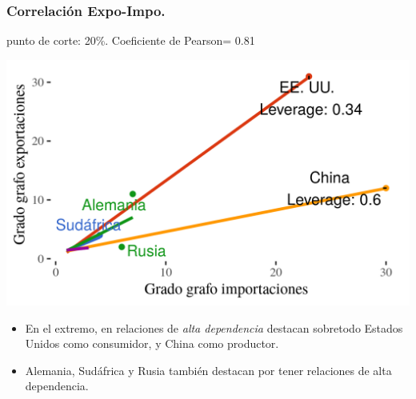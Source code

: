 \documentclass[compress]{beamer}
\begin{document}
\begin{frame}
\frametitle{Correlación Expo-Impo.}

punto de corte: 20\%.
Coeficiente de Pearson= 0.81

\includegraphics[width=\linewidth]{Graficos/corr_grados_2016_20_pcnt}

\end{frame}

\begin{frame}

\begin{itemize}
	\item[\faRebel] En el extremo, en relaciones de \textit{alta dependencia} destacan sobretodo Estados Unidos como consumidor, y China como productor.
	\item[\faRebel] Alemania, Sudáfrica y Rusia también destacan por tener relaciones de alta dependencia. 
\end{itemize}
\end{frame}
\end{document}
